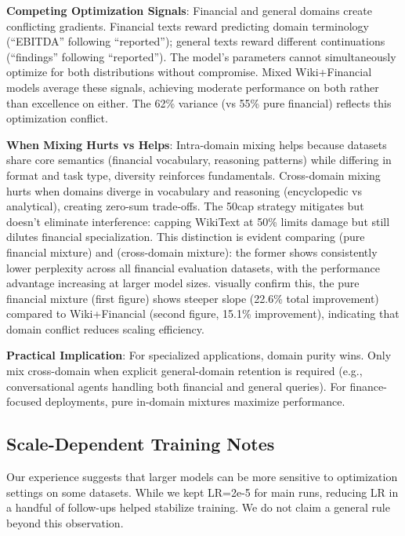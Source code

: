 \textbf{Competing Optimization Signals}: Financial and general domains create conflicting gradients. Financial texts reward predicting domain terminology (``EBITDA'' following ``reported''); general texts reward different continuations (``findings'' following ``reported''). The model's parameters cannot simultaneously optimize for both distributions without compromise. Mixed Wiki+Financial models average these signals, achieving moderate performance on both rather than excellence on either. The 62\% variance (vs 55\% pure financial) reflects this optimization conflict.

\textbf{When Mixing Hurts vs Helps}: Intra-domain mixing helps because datasets share core semantics (financial vocabulary, reasoning patterns) while differing in format and task type, diversity reinforces fundamentals. Cross-domain mixing hurts when domains diverge in vocabulary and reasoning (encyclopedic vs analytical), creating zero-sum trade‑offs. The 50cap strategy mitigates but doesn't eliminate interference: capping WikiText at 50\% limits damage but still dilutes financial specialization. This distinction is evident comparing  (pure financial mixture) and  (cross-domain mixture): the former shows consistently lower perplexity across all financial evaluation datasets, with the performance advantage increasing at larger model sizes.  visually confirm this, the pure financial mixture (first figure) shows steeper slope (22.6\% total improvement) compared to Wiki+Financial (second figure, 15.1\% improvement), indicating that domain conflict reduces scaling efficiency.

\textbf{Practical Implication}: For specialized applications, domain purity wins. Only mix cross-domain when explicit general-domain retention is required (e.g., conversational agents handling both financial and general queries). For finance-focused deployments, pure in-domain mixtures maximize performance.

\subsection{Scale-Dependent Training Notes}

Our experience suggests that larger models can be more sensitive to optimization settings on some datasets. While we kept LR=2e-5 for main runs, reducing LR in a handful of follow-ups helped stabilize training. We do not claim a general rule beyond this observation.


